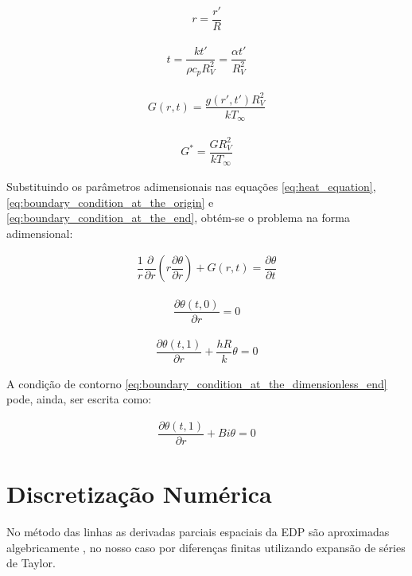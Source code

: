 \begin{gather}
    r = \dfrac{r '}{R}
\end{gather}

\begin{gather}
    t = \dfrac{k t'}{\rho c _p R_{V}^{2}} = \dfrac{\alpha t'}{R_{V}^{2}}
\end{gather}

\begin{gather}
    G (r, t) = \dfrac{g(r' , t') R_{V}^{2}}{k T _\infty}
\end{gather}

\begin{gather}
    G ^* = \dfrac{G R_{V}^{2}}{k T_ \infty}
\end{gather}

Substituindo os parâmetros adimensionais nas equações \ref{eq:heat_equation}, \ref{eq:boundary_condition_at_the_origin} e \ref{eq:boundary_condition_at_the_end}, obtém-se o problema na forma adimensional:

\begin{gather}
    \dfrac{1}{r} \dfrac{\partial}{\partial r} \left(r \dfrac{\partial \theta}{\partial r} \right) + G (r , t) = \dfrac{\partial \theta}{\partial t}
    \label{eq:dimensionless_heat_equation}
\end{gather}

\begin{gather}
    \dfrac{\partial \theta (t , 0)}{\partial r} = 0
    \label{eq:boundary_condition_at_dimensionless_origin}
\end{gather}

\begin{gather}
    \dfrac{\partial \theta (t , 1)}{\partial r} + \dfrac{h R}{k} \theta = 0
    \label{eq:boundary_condition_at_the_dimensionless_end}
\end{gather}

A condição de contorno \ref{eq:boundary_condition_at_the_dimensionless_end} pode, ainda, ser escrita como:

\begin{gather}
    \dfrac{\partial \theta (t , 1)}{\partial r} + Bi \theta = 0
    \label{eq:boundary_condition_at_the_manipulated_dimensionless_end}
\end{gather}

\section{Discretização Numérica}

No método das linhas as derivadas parciais espaciais da EDP são aproximadas algebricamente \citep{schiesser2009}, no nosso caso por diferenças finitas utilizando expansão de séries de Taylor.

